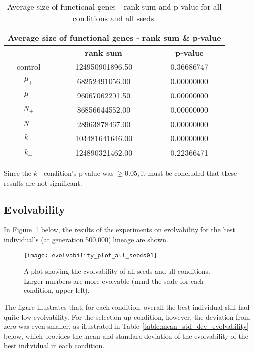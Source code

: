\begin{table}[H]
	\begin{tabular}{|c|c|c|}
		\hline
		\multicolumn{3}{c}{\Large \textbf{Average size of functional genes - rank sum \& p-value}} \\
		\hline
		& \textbf{rank sum} & \textbf{p-value} \\
		\hline
		control & 124950901896.50 & 0.36686747 \\ 
		\hline
		$\mu_+$ & 68252491056.00 & 0.00000000 \\ 
		\hline
		$\mu_-$ & 96067062201.50 & 0.00000000 \\ 
		\hline
		$N_+$ & 86856644552.00 & 0.00000000 \\ 
		\hline
		$N_-$ & 28963878467.00 & 0.00000000 \\ 
		\hline
		$k_+$ & 103481641646.00 & 0.00000000 \\ 
		\hline
		$k_-$ & 124890321462.00 & 0.22366471 \\ 
		\hline
	\end{tabular}
	\caption[Average size of functional genes - rank sum and p-value]{Average size of functional genes - rank sum and p-value for all conditions and all seeds.}
	\label{table:avg_size_of_functional_genes_rank_sum_and_p-value}
\end{table}
Since the $k_-$ condition's p-value was $\geq0.05$, it must be concluded that these results are not significant. 

\subsection{Evolvability}\label{res:evolvability}
In Figure~\ref{fig:evolvability_all_seeds} below, the results of the experiments on evolvability for the best individual's (at generation 500,000) lineage are shown. 
\begin{figure}[H]
	\centering
	\texttt{[image: evolvability\_plot\_all\_seeds01]}
	\caption[Evolvability plot, all seed]{A plot showing the evolvability of all seeds and all conditions. Larger numbers are more evolvable (mind the scale for each condition, upper left).}
	\label{fig:evolvability_all_seeds}	
\end{figure}
The figure illustrates that, for each condition, overall the best individual still had quite low evolvability. For the selection up condition, however, the deviation from zero was even smaller, as illustrated in Table~\ref{table:mean_std_dev_evolvability} below, which provides the mean and standard deviation of the evolvability of the best individual in each condition. 

